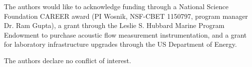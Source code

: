 \documentclass[energies,article,accept,moreauthors,pdftex,12pt,a4paper]{mdpi}
\begin{document}

The authors would like to acknowledge funding through a National Science
Foundation CAREER award (PI Wosnik, NSF-CBET 1150797, program manager Dr. Ram
Gupta), a grant through the Leslie S. Hubbard Marine Program Endowment to
purchase acoustic flow measurement instrumentation, and a grant for laboratory
infrastructure upgrades through the US Department of Energy.


The authors declare no conflict of interest.




\end{document}
